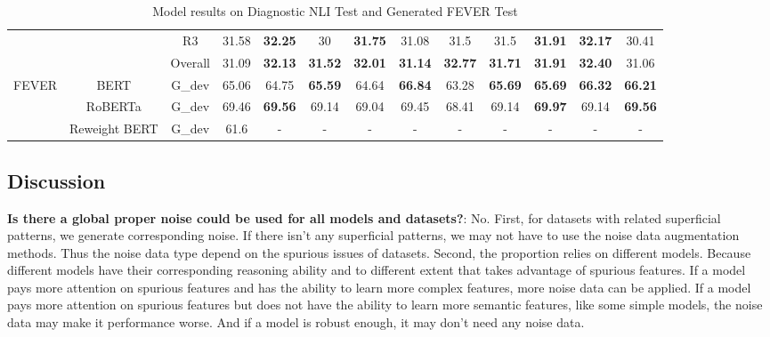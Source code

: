 \begin{table}[]
\begin{tabular}{|c|c|c|c|c|c|c|c|c|c|c|c|c|}
                         &                          & R3                    & 31.58                     & \textbf{32.25}                 & 30             & \textbf{31.75} & 31.08          & 31.5           & 31.5           & \textbf{31.91} & \textbf{32.17} & 30.41          \\ \cline{3-13} 
                         &                          & Overall               & 31.09                     & \textbf{32.13}                 & \textbf{31.52} & \textbf{32.01} & \textbf{31.14} & \textbf{32.77} & \textbf{31.71} & \textbf{31.91} & \textbf{32.40} & 31.06          \\ \hline
\multirow{3}{*}{FEVER}   & BERT                     & G\_dev                & 65.06                     & 64.75                          & \textbf{65.59} & 64.64          & \textbf{66.84} & 63.28          & \textbf{65.69} & \textbf{65.69} & \textbf{66.32} & \textbf{66.21} \\ \cline{2-13} 
                         & RoBERTa                  & G\_dev                & 69.46                     & \textbf{69.56}                 & 69.14          & 69.04          & 69.45          & 68.41          & 69.14          & \textbf{69.97} & 69.14          & \textbf{69.56} \\ \cline{2-13} 
                         & Reweight BERT            & G\_dev                & 61.6                      & -                              & -              & -              & -              & -              & -              & -              & -              & -              \\ \hline
\end{tabular}
	\caption{Model results on Diagnostic NLI Test and Generated FEVER Test}
	\label{tab:snli-fever-stress}
\end{table}

\subsection{Discussion}

\textbf{Is there a global proper noise 
could be used for all models and datasets?}: 
No. First, for datasets with related superficial patterns,
we generate corresponding noise. If there isn't any superficial patterns, we 
may not have to use the noise data augmentation methods. 
Thus the noise data 
type depend on the spurious issues of datasets.
Second, the proportion relies on different models. 
Because different models have their corresponding reasoning ability and to  different extent 
that takes advantage of spurious features. If a model pays more attention on spurious features 
and has the ability to learn more complex features, more noise data can be applied. 
If a model pays more attention on spurious features but does not have the ability to learn more 
semantic features, like some simple models, the noise data may make it performance worse. And if 
a model is robust enough, it may don't need any noise data.





